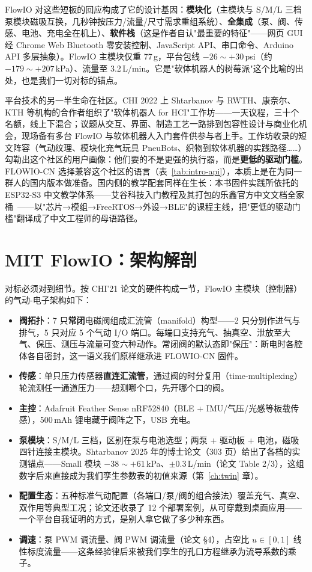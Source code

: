 FlowIO 对这些短板的回应构成了它的设计基因：\textbf{模块化}（主模块与 S/M/L 三档泵模块磁吸互换，几秒钟按压力/流量/尺寸需求重组系统）、\textbf{全集成}（泵、阀、传感、电池、充电全在机上）、\textbf{软件栈}（这是作者自认"最重要的特征"——网页 GUI 经 Chrome Web Bluetooth 零安装控制、JavaScript API、串口命令、Arduino API 多层抽象）。FlowIO 主模块仅重 77\,g，平台包线 $-26\sim+30$\,psi（约 $-179\sim+207$\,kPa）、流量至 3.2\,L/min。它是"软体机器人的树莓派"这个比喻的出处，也是我们一切对标的锚点。

平台技术的另一半生命在社区。CHI 2022 上 Shtarbanov 与 RWTH、康奈尔、KTH 等机构的合作者组织了"软体机器人 for HCI"工作坊——一天议程，三十个名额，线上下混合；议题从交互、界面、制造工艺一路排到包容性设计与商业化机会，现场备有多台 FlowIO 与软体机器人入门套件供参与者上手。工作坊收录的短文阵容（气动纹理、模块化充气玩具 PneuBots、织物到软体机器的实践路径……）勾勒出这个社区的用户画像：他们要的不是更强的执行器，而是\textbf{更低的驱动门槛}。FLOWIO-CN 选择兼容这个社区的语言（表~\ref{tab:intro-api}），本质上是在为同一群人的国内版本做准备。国内侧的教学配套同样在生长：本书固件实践所依托的 ESP32-S3 中文教学体系——艾谷科技入门教程及其打包的乐鑫官方中文文档全家桶~\cite{aigu-tutorial}——以"芯片→模组→FreeRTOS→外设→BLE"的课程主线，把"更低的驱动门槛"翻译成了中文工程师的母语路径。

\section{MIT FlowIO：架构解剖}
\label{sec:intro-flowio}

对标必须对到细节。按 CHI'21 论文的硬件构成一节，FlowIO 主模块（控制器）的气动-电子架构如下：

\begin{itemize}
  \item \textbf{阀拓扑}：7 只\textbf{常闭}电磁阀组成汇流管（manifold）构型——2 只分别作进气与排气，5 只对应 5 个气动 I/O 端口。每端口支持充气、抽真空、泄放至大气、保压、测压与流量可变六种动作。常闭阀的默认态即"保压"：断电时各腔体各自密封，这一语义我们原样继承进 FLOWIO-CN 固件。
  \item \textbf{传感}：单只压力传感器\textbf{直连汇流管}，通过阀的时分复用（time-multiplexing）轮流测任一通道压力——想测哪个口，先开哪个口的阀。
  \item \textbf{主控}：Adafruit Feather Sense nRF52840（BLE + IMU/气压/光感等板载传感），500\,mAh 锂电藏于阀阵之下，USB 充电。
  \item \textbf{泵模块}：S/M/L 三档，区别在泵与电池选型；两泵 + 驱动板 + 电池，磁吸四针连接主模块。Shtarbanov 2025 年的博士论文（303 页）给出了各档的实测锚点——Small 模块 $-38\sim+61$\,kPa、$\pm0.3$\,L/min（论文 Table 2/3），这组数字后来直接成为我们孪生参数表的初值来源（第~\ref{ch:twin} 章）。
  \item \textbf{配置生态}：五种标准气动配置（各端口/泵/阀的组合接法）覆盖充气、真空、双作用等典型工况；论文还收录了 12 个部署案例，从可穿戴到桌面应用——一个平台自我证明的方式，是别人拿它做了多少种东西。
  \item \textbf{调速}：泵 PWM 调流量、阀 PWM 调流量（论文 \S4），占空比 $u\in[0,1]$ 线性标度流量——这条经验律后来被我们孪生的孔口方程继承为流导系数的乘子。
\end{itemize}

